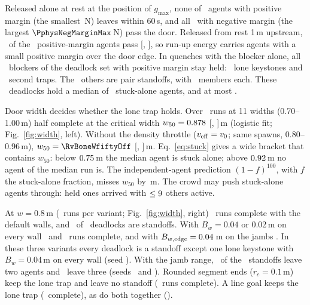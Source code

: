 Released alone at rest at the position of $g_{\max}$, none of \RevBonePosN\ agents with positive margin (the smallest \PphysPosMarginMin\,N) leaves within 60\,s, and all \RevBoneNegN\ with negative margin (the largest $\PphysNegMarginMax$\,N) pass the door. Released from rest 1\,m upstream, \RwSixfPassed\ of the \RwSixfN\ positive-margin agents pass [\RwSixfLo, \RwSixfHi], so run-up energy carries agents with a small positive margin over the door edge. In quenches with the blocker alone, all \FinCritPosN\ blockers of the deadlock set with positive margin stay held: \KeystoneBLone\ lone keystones and \KeystoneBSecondTrap\ second traps. The \FinCritNegN\ others are pair standoffs, with \RwSixStandoffMembersMin\ members each. These \RevAthirteenStackN\ deadlocks hold a median of \RevAthirteenStackMedian\ stuck-alone agents, and at most \RevAthirteenStackMax.

Door width decides whether the lone trap holds. Over \RevBtwoNRuns\ runs at 11 widths (0.70--1.00\,m) half complete at the critical width $w_{50}=0.878$ [\RevBtwoWfiftyLo, \RevBtwoWfiftyHi]\,m (logistic fit; Fig.~\ref{fig:width}, left). Without the density throttle ($v_{\rm eff}=v_0$; same spawns, 0.80--0.96\,m), $w_{50}=\RvBoneWfiftyOff$ [\RvBoneWfiftyOffLo, \RvBoneWfiftyOffHi]\,m. Eq.~\eqref{eq:stuck} gives a wide bracket that contains $w_{50}$: below $0.75$\,m the median agent is stuck alone; above $0.92$\,m no agent of the median run is. The independent-agent prediction $(1-f)^{100}$, with $f$ the stuck-alone fraction, misses $w_{50}$ by \RevBtwoPredHundredOffset\,m. The crowd may push stuck-alone agents through: held ones arrived with $\le9$ others active.

At $w=0.8$\,m (\EsevenN\ runs per variant; Fig.~\ref{fig:width}, right) \EsevenWEightK\ runs complete with the default walls, and \EsevenDefaultCollective\ of \EsevenDefaultClassified\ deadlocks are standoffs. With $B_w=0.04$ or 0.02\,m on every wall \EsevenBallK\ and \EsevenBallTwoK\ runs complete, and with $B_{w,\rm edge}=0.04$\,m on the jambs \EsevenBjambK. In these three variants every deadlock is a standoff except one lone keystone with $B_w=0.04$\,m on every wall (seed \RzHLoneSeed). With the jamb range, \RzHJambTwo\ of the \RzHJambN\ standoffs leave two agents and \RzHJambThree\ leave three (seeds \RzHJambSeedA\ and \RzHJambSeedB). Rounded segment ends ($r_c=0.1$\,m) keep the lone trap and leave no standoff (\EsevenRoundK\ runs complete). A line goal keeps the lone trap (\EsevenLineK\ complete), as do both together (\EsevenLineRoundK).

